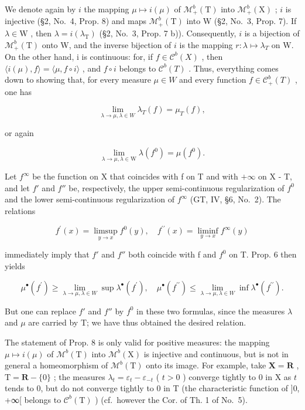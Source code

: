 We denote again by \(i\) the mapping \(\mu \mapsto i(\mu)\) of \(\mathcal{M}_{+}^{b}(\mathrm{T})\) into \(\mathcal{M}_{+}^{b}(\mathrm{X})\) ; \(i\) is injective (§2, No.~4, Prop. 8) and maps \(\mathcal{M}_{+}^{b}(\mathrm{T})\) into W (§2, No.~3, Prop. 7). If \(\lambda \in \mathrm{W}\) , then \(\lambda = i(\lambda_{\mathrm{T}})\) (§2, No.~3, Prop. 7 b)). Consequently, \(i\) is a bijection of \(\mathcal{M}_{+}^{b}(\mathrm{T})\) onto W, and the inverse bijection of \(i\) is the mapping \(r : \lambda \mapsto \lambda_{T}\) on W. On the other hand, i is continuous: for, if \(f \in \mathcal{C}^{b}(X)\) , then \(\langle i(\mu), f \rangle = \langle \mu, f \circ i \rangle\) , and \(f \circ i\) belongs to \(\mathcal{C}^{b}(T)\) . Thus, everything comes down to showing that, for every measure \(\mu \in W\) and every function \(f \in \mathcal{C}_{+}^{b}(T)\) , one has

\[
\lim _ {\lambda \to \mu , \lambda \in W} \lambda_ {T} (f) = \mu_ {T} (f),
\]

or again

\[
\lim _ {\lambda \to \mu ,   \lambda \in \mathrm{W}} \lambda (f ^ {0}) = \mu (f ^ {0}).
\]

Let \(f^{\infty}\) be the function on X that coincides with f on T and with \(+\infty\) on X - T, and let \(f'\) and \(f''\) be, respectively, the upper semi-continuous regularization of \(f^{0}\) and the lower semi-continuous regularization of \(f^{\infty}\) (GT, IV, §6, No.~2). The relations

\[
f ^ {\prime} (x) = \limsup _ {y \to x} f ^ {0} (y), \quad f ^ {\prime \prime} (x) = \liminf _ {y \to x} f ^ {\infty} (y)
\]

immediately imply that \(f'\) and \(f''\) both coincide with f and \(f^{0}\) on T. Prop. 6 then yields

\[
\mu^ {\bullet} (f ^ {\prime}) \geqslant \lim _ {\lambda \to \mu ,   \lambda \in W} \sup \lambda^ {\bullet} (f ^ {\prime})  , \quad \mu^ {\bullet} (f ^ {\prime \prime}) \leqslant \lim _ {\lambda \to \mu ,   \lambda \in W} \inf \lambda^ {\bullet} (f ^ {\prime \prime})  .
\]

But one can replace \(f'\) and \(f''\) by \(f^{0}\) in these two formulas, since the measures \(\lambda\) and \(\mu\) are carried by T; we have thus obtained the desired relation.

The statement of Prop. 8 is only valid for positive measures: the mapping \(\mu \mapsto i(\mu)\) of \(\mathcal{M}^b (\mathrm{T})\) into \(\mathcal{M}^b (\mathrm{X})\) is injective and continuous, but is not in general a homeomorphism of \(\mathcal{M}^b (\mathrm{T})\) onto its image. For example, take \(\mathbf{X} = \mathbf{R}\) , \(\mathrm{T} = \mathbf{R} - \{0\}\) ; the measures \(\lambda_t = \varepsilon_t - \varepsilon_{-t}\) ( \(t > 0\) ) converge tightly to 0 in X as \(t\) tends to 0, but do not converge tightly to 0 in T (the characteristic function of {]}0, +∞{[} belongs to \(\mathcal{C}^b (\mathrm{T})\) ) (cf.~however the Cor. of Th. 1 of No.~5).

